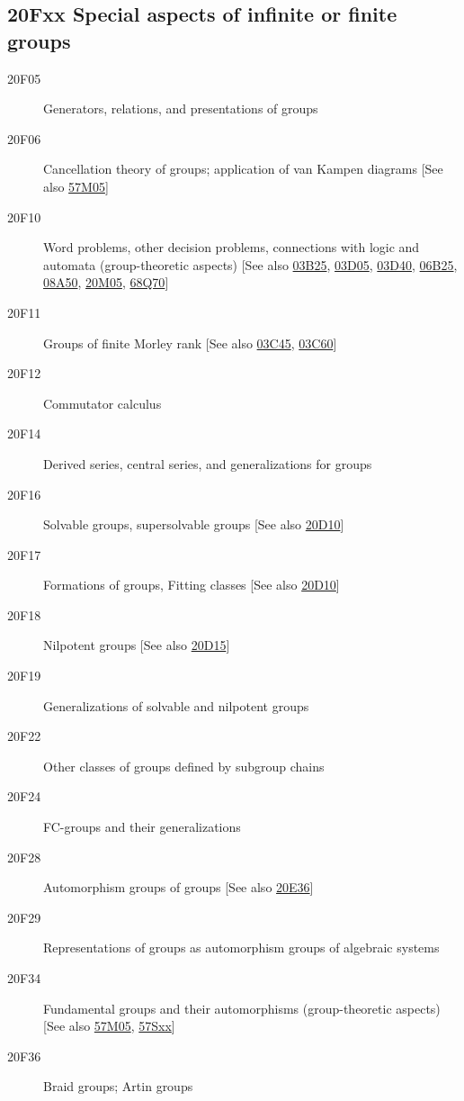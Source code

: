 \documentclass[letterpaper]{article}
\begin{document}
\subsection*{20Fxx  Special aspects of infinite or finite groups }\label{20Fxx}
\begin{description} 
\item [20F05]\label{20F05} Generators, relations, and presentations of groups
\item [20F06]\label{20F06} Cancellation theory of groups; application of van Kampen diagrams [See also \hyperref[57M05]{57M05}]
\item [20F10]\label{20F10} Word problems, other decision problems, connections with logic and automata (group-theoretic aspects) [See also \hyperref[03B25]{03B25}, \hyperref[03D05]{03D05}, \hyperref[03D40]{03D40}, \hyperref[06B25]{06B25}, \hyperref[08A50]{08A50}, \hyperref[20M05]{20M05}, \hyperref[68Q70]{68Q70}]
\item [20F11]\label{20F11} Groups of finite Morley rank [See also \hyperref[03C45]{03C45}, \hyperref[03C60]{03C60}]
\item [20F12]\label{20F12} Commutator calculus
\item [20F14]\label{20F14} Derived series, central series, and generalizations for  groups
\item [20F16]\label{20F16} Solvable groups, supersolvable groups [See also \hyperref[20D10]{20D10}]
\item [20F17]\label{20F17} Formations of groups, Fitting classes [See also \hyperref[20D10]{20D10}]
\item [20F18]\label{20F18} Nilpotent groups [See also \hyperref[20D15]{20D15}]
\item [20F19]\label{20F19} Generalizations of solvable and nilpotent groups
\item [20F22]\label{20F22} Other classes of groups defined by subgroup chains
\item [20F24]\label{20F24} FC-groups and their generalizations
\item [20F28]\label{20F28} Automorphism groups of groups [See also \hyperref[20E36]{20E36}]
\item [20F29]\label{20F29} Representations of groups as automorphism groups of algebraic systems
\item [20F34]\label{20F34} Fundamental groups and their automorphisms (group-theoretic aspects) [See also \hyperref[57M05]{57M05}, \hyperref[57Sxx]{57Sxx}]
\item [20F36]\label{20F36} Braid groups; Artin groups

\end{description}
\end{document}
